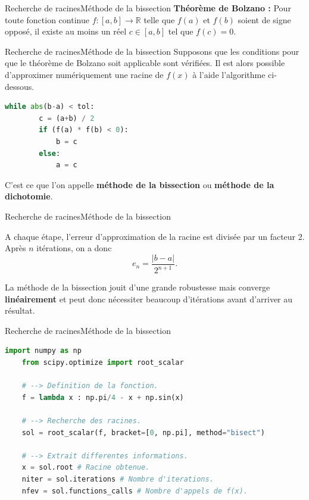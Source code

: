 \documentclass[usenames,dvipsnames,svgnames,10pt,aspectratio=169]{beamer}
\begin{document}
\begin{frame}[t, c]{Recherche de racines}{Méthode de la bissection}
  \textbf{Théorème de Bolzano :} Pour toute fonction continue $f : \left[a, b \right] \to \mathbb{R}$ telle que $f(a)$ et $f(b)$ soient de signe opposé, il existe au moins un réel $c \in \left[a, b\right]$ tel que $f(c) = 0$.
\end{frame}

\begin{frame}[t, c, fragile]{Recherche de racines}{Méthode de la bissection}
  Supposons que les conditions pour que le théorème de Bolzano soit applicable sont vérifiées.
  Il est alors possible d'approximer numériquement une racine de $f(x)$ à l'aide l'algorithme ci-dessous.
  
  \bigskip
  
  \begin{lstlisting}[language=Python]
    while abs(b-a) < tol:
        c = (a+b) / 2
        if (f(a) * f(b) < 0):
            b = c
        else:
            a = c
  \end{lstlisting}
  
  C'est ce que l'on appelle \textbf{\alert{méthode de la bissection}} ou \textbf{\alert{méthode de la dichotomie}}.
\end{frame}

\begin{frame}[t, c]{Recherche de racines}{Méthode de la bissection}
  \begin{minipage}{.68\textwidth}
    A chaque étape, l'erreur d'approximation de la racine est divisée par un facteur 2.
    Après $n$ itérations, on a donc
    \[
    e_n = \dfrac{\vert b - a \vert}{2^{n+1}}.
    \]

    \bigskip

    La méthode de la bissection jouit d'une grande robustesse mais converge \textbf{\alert{linéairement}} et peut donc nécessiter beaucoup d'itérations avant d'arriver au résultat.
    
  \end{minipage}%
  \hfill
  \begin{minipage}{.28\textwidth}
  \end{minipage}
\end{frame}

\begin{frame}[t, c, fragile]{Recherche de racines}{Méthode de la bissection}
  \begin{lstlisting}[language=Python]
    import numpy as np
    from scipy.optimize import root_scalar

    # --> Definition de la fonction.
    f = lambda x : np.pi/4 - x + np.sin(x)

    # --> Recherche des racines.
    sol = root_scalar(f, bracket=[0, np.pi], method="bisect")

    # --> Extrait differentes informations.
    x = sol.root # Racine obtenue.
    niter = sol.iterations # Nombre d'iterations.
    nfev = sol.functions_calls # Nombre d'appels de f(x).
  \end{lstlisting}
\end{frame}
\end{document}
